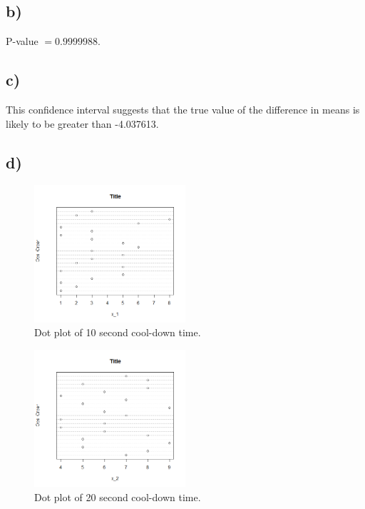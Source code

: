 \documentclass{article}
\begin{document}
\subsection*{b)}
P-value $= 0.9999988$.
\subsection*{c)}
This confidence interval suggests that the true value of the difference
in means is likely to be greater than -4.037613.
\clearpage
\subsection*{d)}
\begin{figure}[h]
    \centering
    \includegraphics[width=0.5\textwidth]{./hw_1/images/dot_1.png}
    \caption{Dot plot of 10 second cool-down time.}
    \label{fig:4_a}
  \end{figure}
  \begin{figure}[h]
    \centering
    \includegraphics[width=0.5\textwidth]{./hw_1/images/dot_2.png}
    \caption{Dot plot of 20 second cool-down time.}
    \label{fig:4_a}
  \end{figure}
\clearpage
\end{document}
